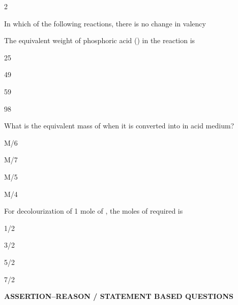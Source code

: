 \documentclass[10pt,a4paper]{article}
\begin{document}
\begin{multicols}{2}
\begin{questions}[start=1]
\item In which of the following reactions, there is no change in valency
\begin{options}
  \item {}
  \item {}
  \item {}
  \item {}
\end{options}

\item The equivalent weight of phosphoric acid () in the reaction  is
\begin{options}
  \item 25
  \item 49
  \item 59
  \item 98
\end{options}

\item What is the equivalent mass of  when it is converted into  in acid medium?
\begin{options}
  \item M/6
  \item M/7
  \item M/5
  \item M/4
\end{options}

\item For decolourization of 1 mole of , the moles of  required is
\begin{options}
  \item 1/2
  \item 3/2
  \item 5/2
  \item 7/2
\end{options}

\end{questions}
\end{multicols}

\begin{mdframed}[backgroundcolor=sectionbg, linewidth=0pt, innerleftmargin=6pt, innerrightmargin=6pt, innertopmargin=4pt, innerbottommargin=4pt]
\color{white}\bfseries\small\centering ASSERTION--REASON / STATEMENT BASED QUESTIONS
\end{mdframed}
\end{document}

